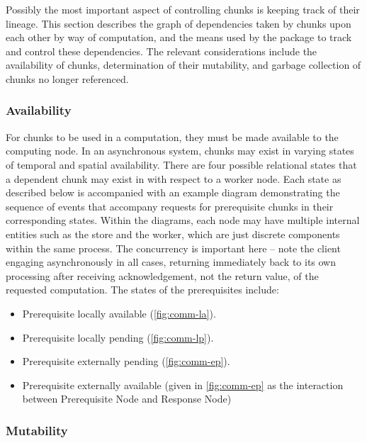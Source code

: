 Possibly the most important aspect of controlling chunks is keeping track of their lineage.
This section describes the graph of dependencies taken by chunks upon each other by way of computation, and the means used by the  package to track and control these dependencies.
The relevant considerations include the availability of chunks, determination of their mutability, and garbage collection of chunks no longer referenced.

\subsubsection{Availability}

For chunks to be used in a computation, they must be made available to the computing node.
In an asynchronous system, chunks may exist in varying states of temporal and spatial availability.
There are four possible relational states that a dependent chunk may exist in with respect to a worker node.
Each state as described below is accompanied with an example diagram demonstrating the sequence of events that accompany requests for prerequisite chunks in their corresponding states.
Within the diagrams, each node may have multiple internal entities such as the store and the worker, which are just discrete components within the same process.
The concurrency is important here -- note the client engaging asynchronously in all cases, returning immediately back to its own processing after receiving acknowledgement, not the return value, of the requested computation.
The states of the prerequisites include:

\begin{itemize}
	\item Prerequisite locally available (\cref{fig:comm-la}).
	\item Prerequisite locally pending (\cref{fig:comm-lp}).
	\item Prerequisite externally pending (\cref{fig:comm-ep}).
	\item Prerequisite externally available (given in \cref{fig:comm-ep} as the interaction between Prerequisite Node and Response Node)
\end{itemize}


\subsubsection{Mutability}

